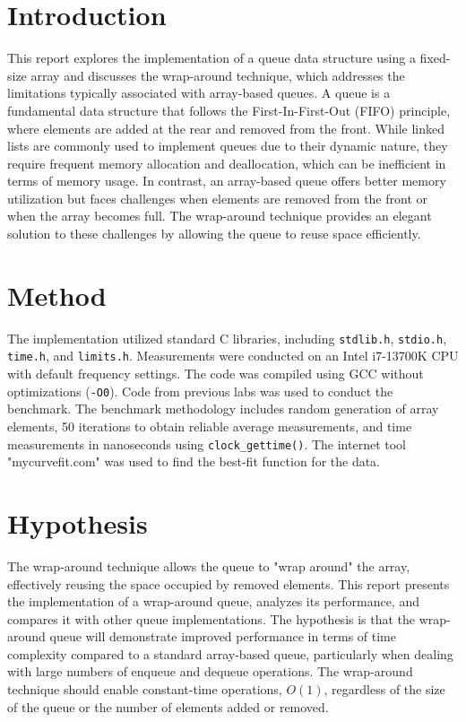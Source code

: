 \section*{Introduction}
This report explores the implementation of a queue data structure using a fixed-size array and discusses the wrap-around technique, which addresses the limitations typically associated with array-based queues. A queue is a fundamental data structure that follows the First-In-First-Out (FIFO) principle, where elements are added at the rear and removed from the front. While linked lists are commonly used to implement queues due to their dynamic nature, they require frequent memory allocation and deallocation, which can be inefficient in terms of memory usage. In contrast, an array-based queue offers better memory utilization but faces challenges when elements are removed from the front or when the array becomes full. The wrap-around technique provides an elegant solution to these challenges by allowing the queue to reuse space efficiently.

\section*{Method}
The implementation utilized standard C libraries, including \texttt{stdlib.h}, \texttt{stdio.h}, \texttt{time.h}, and \texttt{limits.h}. Measurements were conducted on an Intel i7-13700K CPU with default frequency settings. The code was compiled using GCC without optimizations (\texttt{-O0}). Code from previous labs was used to conduct the benchmark. The benchmark methodology includes random generation of array elements, 50 iterations to obtain reliable average measurements, and time measurements in nanoseconds using \texttt{clock_gettime()}. The internet tool "mycurvefit.com" was used to find the best-fit function for the data.

\section*{Hypothesis}
The wrap-around technique allows the queue to "wrap around" the array, effectively reusing the space occupied by removed elements. This report presents the implementation of a wrap-around queue, analyzes its performance, and compares it with other queue implementations. The hypothesis is that the wrap-around queue will demonstrate improved performance in terms of time complexity compared to a standard array-based queue, particularly when dealing with large numbers of enqueue and dequeue operations. The wrap-around technique should enable constant-time operations, $O(1)$, regardless of the size of the queue or the number of elements added or removed.

